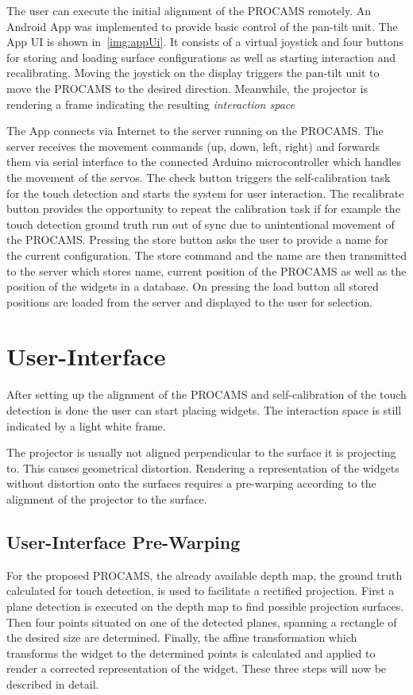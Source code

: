 The user can execute the initial alignment of the PROCAMS remotely. An Android App was implemented to provide basic control of the pan-tilt unit. The App UI is shown in~\autoref{img:appUi}. It consists of a virtual joystick and four buttons for storing and loading surface configurations as well as starting interaction and recalibrating. Moving the joystick on the display triggers the pan-tilt unit to move the PROCAMS to the desired direction. Meanwhile, the projector is rendering a frame indicating the resulting \textit{interaction space}

The App connects via Internet to the server running on the PROCAMS. The server receives the movement commands (up, down, left, right) and forwards them via serial interface to the connected Arduino microcontroller which handles the movement of the servos. The check button triggers the self-calibration task for the touch detection and starts the system for user interaction. The recalibrate button provides the opportunity to repeat the calibration task if for example the touch detection ground truth run out of sync due to unintentional movement of the PROCAMS. Pressing the store button asks the user to provide a name for the current configuration. The store command and the name are then transmitted to the server which stores name, current position of the PROCAMS as well as the position of the widgets in a database. On pressing the load button all stored positions are loaded from the server and displayed to the user for selection.

\section{User-Interface} 
After setting up the alignment of the PROCAMS and self-calibration of the touch detection is done the user can start placing widgets. The interaction space is still indicated by a light white frame.

The projector is usually not aligned perpendicular to the surface it is projecting to. This causes geometrical distortion. 
Rendering a representation of the widgets without distortion onto the surfaces requires a pre-warping according to the alignment of the projector to the surface.


\subsection{User-Interface Pre-Warping}
For the proposed PROCAMS, the already available depth map, the ground truth calculated for touch detection, is used to facilitate a rectified projection. First a plane detection is executed on the depth map to find possible projection surfaces. Then four points situated on one of the detected planes, spanning a rectangle of the desired size are determined. Finally, the affine transformation which transforms the widget to the determined points is calculated and applied to render a corrected representation of the widget. These three steps will now be described in detail.

